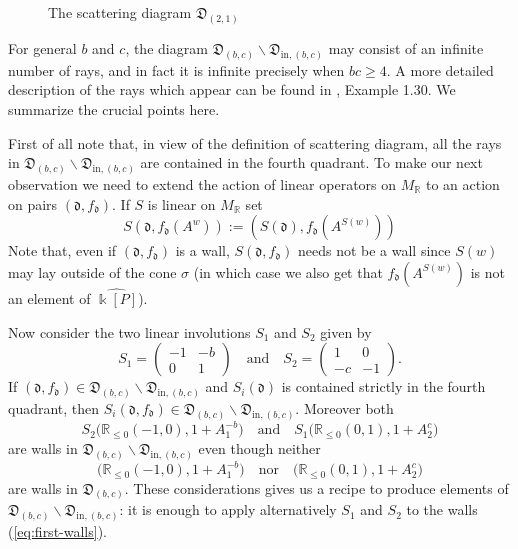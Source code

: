 \documentclass[11pt]{amsart}
\theoremstyle{remark}
\numberwithin{equation}{section}
\newcommand{\RR}{\mathbb{R}}
\newcommand{\fd}{\mathfrak{d}}
\newcommand{\fD}{\mathfrak{D}}
\begin{document}
\begin{figure}
  \centering
  \caption{The scattering diagram $\fD_{(2,1)}$} 
  \label{fig:diagex}
\end{figure}

For general $b$ and $c$, the diagram $\fD_{(b,c)} \backslash
\fD_{\mathrm{in},(b,c)}$ may consist of an infinite number of rays, and in fact
it is infinite precisely when $bc\ge 4$. A more detailed description of the rays
which appear can be found in \cite{GHKK}, Example 1.30. We summarize the crucial
points here.

First of all note that, in view of the definition of scattering diagram, all the
rays in  $\fD_{(b,c)} \backslash \fD_{\mathrm{in},(b,c)}$ are contained in the
fourth quadrant.  To make our next observation we need to extend the action of
linear operators on $M_\RR$ to an action on pairs $(\fd,f_\fd)$. If $S$ is
linear on $M_\RR$ set
\begin{equation}
  \label{eqn:linear action}
  S(\fd,f_\fd(A^w))
  :=
  \left( S(\fd), f_\fd\left(A^{S(w)}\right) \right)
\end{equation}
Note that, even if $(\fd,f_\fd)$ is a wall, $S(\fd,f_\fd)$ needs not be a wall
since $S(w)$ may lay outside of the cone $\sigma$ (in which case we also get
that  $f_\fd\left(A^{S(w)}\right)$ is not an element of $\widehat{\Bbbk [P]}$).

Now consider the two linear involutions $S_1$ and $S_2$ given by
\[
  S_1 =  
  \begin{pmatrix}
    -1 & -b \\
    0& 1
  \end{pmatrix}
  \quad
  \mbox{and}
  \quad
  S_2 =  
  \begin{pmatrix}
    1 & 0 \\
    -c & -1
  \end{pmatrix}.
\]
If $(\fd, f_{\fd}) \in \fD_{(b,c)} \backslash \fD_{\mathrm{in},(b,c)}$ and $S_i
(\fd)$ is contained strictly in the fourth quadrant, then $S_i(\fd, f_{\fd}) \in
\fD_{(b,c)} \backslash \fD_{\mathrm{in},(b,c)}$. Moreover both 
\begin{equation}
  \label{eq:first-walls}
  S_2\big(\RR_{\leq 0}(-1,0),1+A_1^{-b}\big)
  \quad
  \mbox{and}
  \quad
  S_1\big(\RR_{\leq 0}(0,1),1+A_2^c\big)
\end{equation}
are walls in $\fD_{(b,c)} \backslash \fD_{\mathrm{in},(b,c)}$ even though
neither 
\[
  \big(\RR_{\leq 0}(-1,0),1+A_1^{-b}\big)
  \quad
  \mbox{nor}
  \quad
  \big(\RR_{\leq 0}(0,1),1+A_2^c\big)
\]
are walls in $\fD_{(b,c)}$. These considerations gives us a recipe to produce
elements of $\fD_{(b,c)} \backslash \fD_{\mathrm{in},(b,c)}$: it is enough to apply
alternatively $S_1$ and $S_2$ to the walls (\ref{eq:first-walls}).
\end{document}
